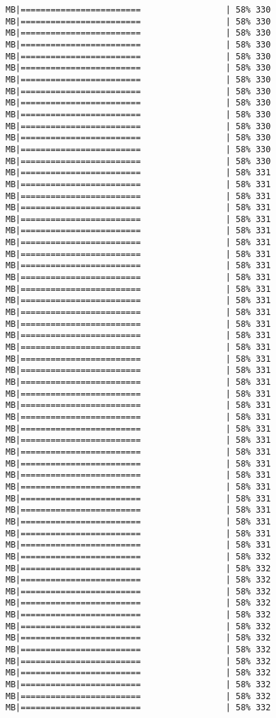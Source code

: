 \documentclass[
]{article}
\begin{document}
\begin{verbatim}
MB|========================                 | 58% 330 MB|========================                 | 58% 330 MB|========================                 | 58% 330 MB|========================                 | 58% 330 MB|========================                 | 58% 330 MB|========================                 | 58% 330 MB|========================                 | 58% 330 MB|========================                 | 58% 330 MB|========================                 | 58% 330 MB|========================                 | 58% 330 MB|========================                 | 58% 330 MB|========================                 | 58% 330 MB|========================                 | 58% 330 MB|========================                 | 58% 330 MB|========================                 | 58% 331 MB|========================                 | 58% 331 MB|========================                 | 58% 331 MB|========================                 | 58% 331 MB|========================                 | 58% 331 MB|========================                 | 58% 331 MB|========================                 | 58% 331 MB|========================                 | 58% 331 MB|========================                 | 58% 331 MB|========================                 | 58% 331 MB|========================                 | 58% 331 MB|========================                 | 58% 331 MB|========================                 | 58% 331 MB|========================                 | 58% 331 MB|========================                 | 58% 331 MB|========================                 | 58% 331 MB|========================                 | 58% 331 MB|========================                 | 58% 331 MB|========================                 | 58% 331 MB|========================                 | 58% 331 MB|========================                 | 58% 331 MB|========================                 | 58% 331 MB|========================                 | 58% 331 MB|========================                 | 58% 331 MB|========================                 | 58% 331 MB|========================                 | 58% 331 MB|========================                 | 58% 331 MB|========================                 | 58% 331 MB|========================                 | 58% 331 MB|========================                 | 58% 331 MB|========================                 | 58% 331 MB|========================                 | 58% 331 MB|========================                 | 58% 331 MB|========================                 | 58% 332 MB|========================                 | 58% 332 MB|========================                 | 58% 332 MB|========================                 | 58% 332 MB|========================                 | 58% 332 MB|========================                 | 58% 332 MB|========================                 | 58% 332 MB|========================                 | 58% 332 MB|========================                 | 58% 332 MB|========================                 | 58% 332 MB|========================                 | 58% 332 MB|========================                 | 58% 332 MB|========================                 | 58% 332 MB|========================                 | 58% 332 
\end{verbatim}
\end{document}
